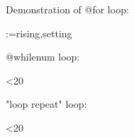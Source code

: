 \documentclass{article}
\begin{document}
    Demonstration of @for loop:

    \makeatletter
    \@for\sun:={rising,setting}
    \makeatother


    @whilenum loop:
    
    \setcounter{int}{0}
    \makeatletter
    \@whilenum\value{int}<20\do
    {\ifthenelse{\isodd{\value{int}}}{\theint\text{ }}{}}
    \makeatother
    
    "loop repeat" loop:
    
    \setcounter{int}{1}
    \loop
    \theint
    \text{ }\addtocounter{int}{2}\ifnum\value{int}<20
    \repeat
\end{document}
